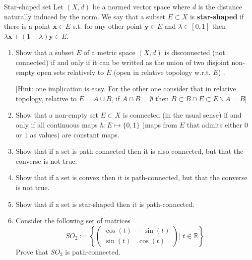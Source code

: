 \documentclass[12pt,a4paper]{article}
\begin{document}
\begin{Definition}{Star-shaped set}{}
	Let $(X,d)$ be a normed vector space where $d$ is the distance naturally induced by the norm. We say that a subset $E\subset X$ is \textbf{star-shaped} if there is a point $\textbf{x}\in E$ s.t. for any other point $\textbf{y}\in E$ and $\lambda\in[0,1]$ then $\lambda\textbf{x}+ (1-\lambda)\textbf{y}\in E$.
\end{Definition}

\begin{enumerate}
	\item Show that a subset $E$ of a metric space $(X,d)$ is disconnected (not connected) if and only if it can be writted as the union of two disjoint non-empty open sets relatively to $E$ (open in relative topology w.r.t. $E$) .
	
	[Hint: one implication is easy. For the other one consider that in relative topology, relative to $E=A\cup B$, if $A\cap\overline B=\emptyset$ then $B\subset \overline B\cap E \subset E\backslash A = B$]
	\item Show that a non-empty set $E\subset X$ is connected (in the usual sense) if and only if all continuous maps $h:E\mapsto \{0,1\}$ (maps from $E$ that admits either 0 or 1 as values) are constant maps.
	\item Show that if a set is path connected then it is also connected, but that the converse is not true.
	\item Show that if a set is convex then it is path-connected, but that the converse is not true.
	\item Show that if a set is star-shaped then it is path-connected.
	
	\item Consider the following set of matrices $$SO_2:=\left\{ \begin{pmatrix} 
		\cos(t)& -\sin(t)\\
		\sin(t) & \cos(t)
	\end{pmatrix} \Big|\; t\in\mathbb{R} \right\}$$ Prove that $SO_2$ is path-connected. 
\end{enumerate}
\bigskip
\end{document}

